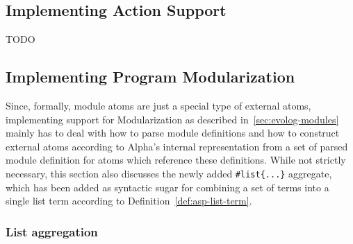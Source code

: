 \subsection{Implementing Action Support}

TODO

\subsection{Implementing Program Modularization}

Since, formally, module atoms are just a special type of external atoms, implementing support for Modularization as described in~\ref{sec:evolog-modules} mainly has to deal with how to parse module definitions and how to construct external atoms according to Alpha's internal representation from a set of parsed module definition for atoms which reference these definitions. While not strictly necessary, this section also discusses the newly added \texttt{\#list\{...\}} aggregate, which has been added as syntactic sugar for combining a set of terms into a single list term according to Definition~\ref{def:asp-list-term}.

\subsubsection{List aggregation}

